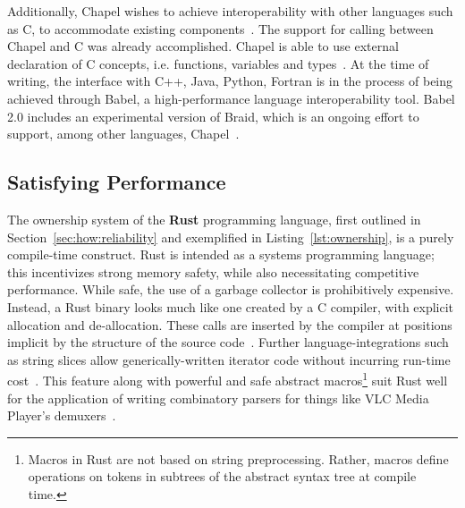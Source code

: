 Additionally, Chapel wishes to achieve interoperability with other languages such as C, to accommodate existing components~\cite{chapel}.
The support for calling between Chapel and C was already accomplished. Chapel is able to use external declaration of C concepts, i.e. functions, variables and types~\cite{chapelSite}.
At the time of writing, the interface with  C++, Java, Python, Fortran is in the process of being achieved through Babel, a high-performance language interoperability tool. Babel 2.0 includes an experimental version of Braid, which is an ongoing effort to support, among other languages, Chapel~\cite{babelSite}.

\subsection{Satisfying Performance}
\label{sec:how:performance}
 

The ownership system of the \textbf{Rust} programming language, first outlined in Section~\ref{sec:how:reliability} and exemplified in Listing~\ref{lst:ownership}, is a purely compile-time construct. Rust is intended as a systems programming language; this incentivizes strong memory safety, while also necessitating competitive performance. While safe, the use of a garbage collector is prohibitively expensive. Instead, a Rust binary looks much like one created by a C compiler, with explicit allocation and de-allocation. These calls are inserted by the compiler at positions implicit by the structure of the source code~\cite{rustSystem}. Further language-integrations such as string slices allow generically-written iterator code without incurring run-time cost~\cite{slicing,vectorization}. This feature along with powerful and safe abstract macros\footnote{Macros in Rust are not based on string preprocessing. Rather, macros define operations on tokens in subtrees of the abstract syntax tree at compile time.} suit Rust well for the application of writing combinatory parsers for things like VLC Media Player's demuxers~\cite{rustParse,nom}.



